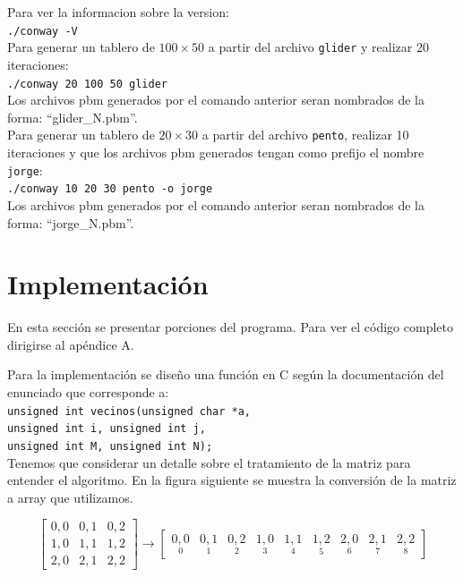 \documentclass[11pt,a4paper]{article}
\begin{document}
Para ver la informacion sobre la version:\\

\texttt{./conway -V}\\

Para generar un tablero de $100 \times 50$ a partir del archivo \texttt{glider} y realizar 20 iteraciones:\\

\texttt{./conway 20 100 50 glider}\\

Los archivos pbm generados por el comando anterior seran nombrados de la forma: ``glider\_N.pbm''.\\

Para generar un tablero de $20 \times 30$ a partir del archivo \texttt{pento}, realizar 10 iteraciones y que los archivos pbm generados tengan como prefijo el nombre \texttt{jorge}:\\

\texttt{./conway 10 20 30 pento -o jorge}\\

Los archivos pbm generados por el comando anterior seran nombrados de la forma: ``jorge\_N.pbm''.

\section{Implementación}
En esta sección se presentar porciones del programa. Para ver el código completo dirigirse al apéndice A.

Para la implementación se diseño una función en C según la documentación del enunciado que corresponde a:\\
\texttt{unsigned int vecinos(unsigned char *a,\\
	unsigned int i, unsigned int j,\\
	unsigned int M, unsigned int N);}\\

Tenemos que considerar un detalle sobre el tratamiento de la matriz para entender el algoritmo. En la figura siguiente se muestra la conversión de la matriz a array que utilizamos.

\begin{equation*}
\begin{bmatrix}
0,0 & 0,1 & 0,2 \\
1,0 & 1,1 & 1,2 \\
2,0 & 2,1 & 2,2
\end{bmatrix}
\rightarrow 
\begin{bmatrix}
\underset{0}{0,0} & \underset{1}{0,1} & \underset{2}{0,2} & \underset{3}{1,0} & \underset{4}{1,1} & \underset{5}{1,2} & \underset{6}{2,0} & \underset{7}{2,1} & \underset{8}{2,2}
\end{bmatrix}
\end{equation*}
\end{document}
